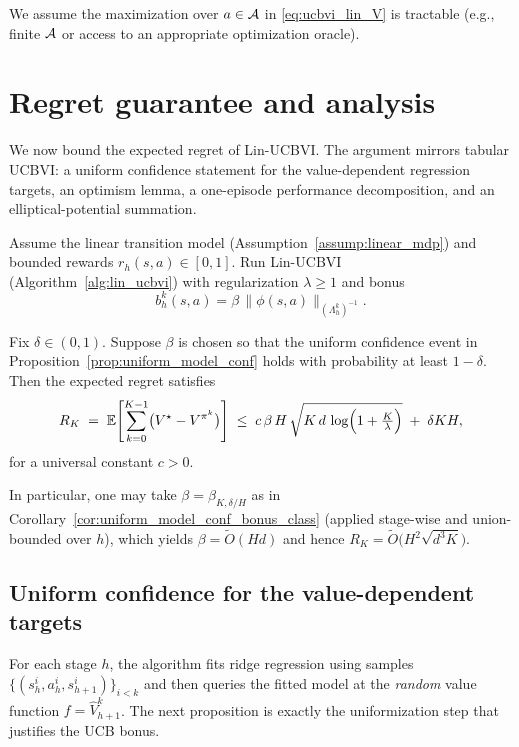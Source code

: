 We assume the maximization over $a\in\mathcal{A}$ in \eqref{eq:ucbvi_lin_V} is tractable (e.g.,
finite $\mathcal{A}$ or access to an appropriate optimization oracle).

\section{Regret guarantee and analysis}
\label{sec:linear_mdp_analysis}

We now bound the expected regret of Lin-UCBVI.  The argument mirrors tabular UCBVI:
a uniform confidence statement for the value-dependent regression targets, an optimism
lemma, a one-episode performance decomposition, and an elliptical-potential summation.

\begin{theorem}\label{thm:ucbvi_lin_regret}
Assume the linear transition model (Assumption~\ref{assump:linear_mdp}) and bounded rewards
$r_h(s,a)\in[0,1]$.  Run Lin-UCBVI (Algorithm~\ref{alg:lin_ucbvi}) with regularization
$\lambda\ge 1$ and bonus
\[
b_h^k(s,a)=\beta\,\|\phi(s,a)\|_{(\Lambda_h^k)^{-1}}.
\]

Fix $\delta\in(0,1)$.  Suppose $\beta$ is chosen so that the uniform confidence event in
Proposition~\ref{prop:uniform_model_conf} holds with probability at least $1-\delta$.
Then the expected regret satisfies
\[
R_K
\;=\;
\mathbb{E}\!\left[\sum_{k=0}^{K-1}\bigl(V^\star - V^{\pi^k}\bigr)\right]
\;\le\;
c\,\beta\,H\,\sqrt{K\,d\,\log\!\Big(1+\tfrac{K}{\lambda}\Big)}
\;+\;
\delta K H,
\]
for a universal constant $c>0$.

In particular, one may take $\beta=\beta_{K,\delta/H}$ as in
Corollary~\ref{cor:uniform_model_conf_bonus_class} (applied stage-wise and union-bounded over $h$),
which yields $\beta=\widetilde O(Hd)$ and hence
$R_K=\widetilde O\!\big(H^2\sqrt{d^3K}\big)$.
\end{theorem}

\subsection{Uniform confidence for the value-dependent targets}

For each stage $h$, the algorithm fits ridge regression using samples
$\{(s_h^i,a_h^i,s_{h+1}^i)\}_{i<k}$ and then queries the fitted model at the
\emph{random} value function $f=\widehat V_{h+1}^k$.  The next proposition is exactly the
uniformization step that justifies the UCB bonus.

